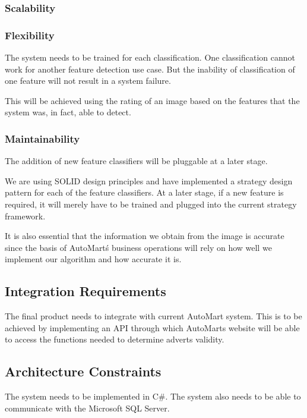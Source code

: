 \subsubsection{Scalability}

\subsubsection{Flexibility}
The system needs to be trained for each classification. One classification cannot work for another feature detection use case. But the inability of classification of one feature will not result in a system failure. 

This will be achieved using the rating of an image based on the features that the system was, in fact, able to detect.
\subsubsection{Maintainability}
The addition of new feature classifiers will be pluggable at a later stage. 

We are using SOLID design principles and have implemented a strategy design pattern for each of the feature classifiers. At a later stage, if a new feature is required, it will merely have to be trained and plugged into the current strategy framework.

It is also essential that the information we obtain from the image is accurate since the basis of AutoMart\'s business operations will rely on how well we implement our algorithm and how accurate it is.

\subsection{Integration Requirements}
The final product needs to integrate with current AutoMart system. This is to be achieved by implementing an API through which AutoMarts website will be able to access the functions needed to determine adverts validity.

\subsection{Architecture Constraints}
The system needs to be implemented in C\#. The system also needs to be able to communicate with the Microsoft SQL Server.